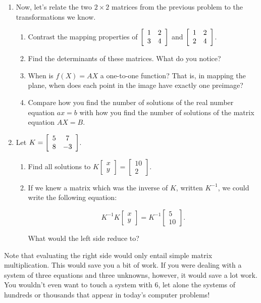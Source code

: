 \documentclass[../gatm.tex]{subfiles}
\begin{document}
\begin{enumerate}
\begin{enumerate}
\end{enumerate}
\item Now, let's relate the two $2\times 2$ matrices from the previous problem to the transformations we know.
\begin{enumerate}
\item Contrast the mapping properties of $\left[\begin{array}{cc} 1 & 2 \\ 3 & 4 \end{array}\right]$ and $\left[\begin{array}{cc} 1 & 2 \\ 2 & 4 \end{array}\right]$.
\item Find the determinants of these matrices. What do you notice?
\item When is $f(X)=AX$ a one-to-one function? That is, in mapping the plane, when does each point in the image have exactly one preimage?
\item Compare how you find the number of solutions of the real number equation $ax=b$ with how you find the number of solutions of the matrix equation $AX=B$.
\end{enumerate}
\item Let $K=\left[\begin{array}{cc} 5 & 7 \\ 8 & -3 \end{array}\right]$.\begin{enumerate}
\item Find all solutions to $K\left[\begin{array}{c} x \\ y \end{array}\right]=\left[\begin{array}{c} 10 \\ 2 \end{array}\right]$.
\item If we knew a matrix which was the inverse of $K$, written $K^{-1}$, we could write the following equation:

$$K^{-1}K\left[\begin{array}{c} x \\ y \end{array}\right]=K^{-1}\left[\begin{array}{c} 5 \\ 10 \end{array}\right].$$

What would the left side reduce to?
\end{enumerate}
\setcounter{problem_i}{\value{enumi}}
\end{enumerate}

Note that evaluating the right side would only entail simple matrix multiplication. This would save you a bit of work. If you were dealing with a system of three equations and three unknowns, however, it would save a lot work. You wouldn't even want to touch a system with $6$, let alone the systems of hundreds or thousands that appear in today's computer problems!
\end{document}
